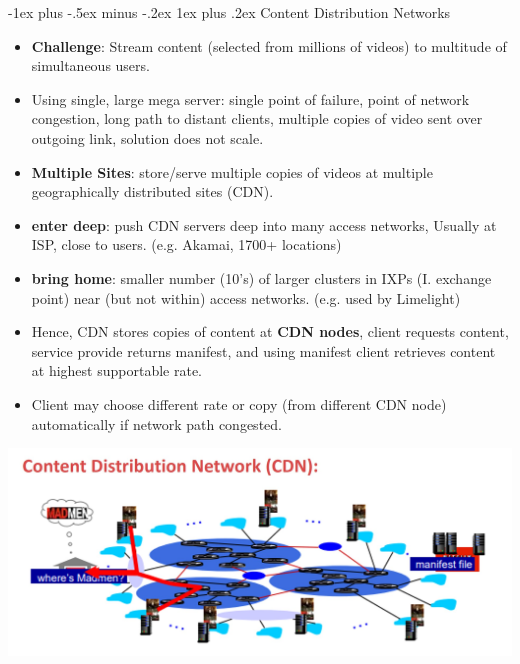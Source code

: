 \documentclass[12pt, landscape]{article}
\makeatletter
\renewcommand{\subsubsection}{\@startsection{subsubsection}{3}{0.1mm}%
                                {-1ex plus -.5ex minus -.2ex}%
                                {1ex plus .2ex}%
                                {\normalfont\small\bfseries}}
\makeatother
\begin{document}
\begin{multicols*}{3}
\subsubsection{Content Distribution Networks}
\begin{itemize}
\item \textbf{Challenge}: Stream content (selected from millions of videos) to multitude of simultaneous users.
\item Using single, large mega server: single point of failure, point of network congestion, long path to distant clients,  multiple copies of video sent over outgoing link, solution does not scale.
\item \textbf{Multiple Sites}: store/serve multiple copies of videos at multiple geographically distributed sites (CDN).
\item \textbf{enter deep}: push CDN servers deep into many access networks, Usually at ISP, close to users. (e.g. Akamai, 1700+ locations)
\item \textbf{bring home}: smaller number (10’s) of larger clusters in IXPs (I. exchange point) near (but not within) access networks. (e.g. used by Limelight)
\item Hence, CDN stores copies of content at \textbf{CDN nodes}, client requests content, service provide returns manifest, and using manifest client retrieves content at highest supportable rate.
\item Client may choose different rate or copy (from different CDN node) automatically if network path congested.
\end{itemize}
\centerline{\includegraphics[width=0.9\linewidth]{CDN}}



\vfill \null
\columnbreak


\vfill \null
\columnbreak


\end{multicols*}
\end{document}
